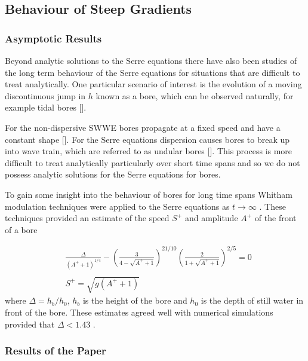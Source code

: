 \subsection{Behaviour of Steep Gradients}




\subsubsection{Asymptotic Results}
Beyond analytic solutions to the Serre equations there have also been studies of the long term behaviour of the Serre equations for situations that are difficult to treat analytically. One particular scenario of interest is the evolution of a moving discontinuous jump in $h$ known as a bore, which can be observed naturally, for example tidal bores [].

For the non-dispersive SWWE bores propagate at a fixed speed and have a constant shape []. For the Serre equations dispersion causes bores to break up into wave train, which are referred to as undular bores []. This process is more difficult to treat analytically particularly over short time spans and so we do not possess analytic solutions for the Serre equations for bores.

To gain some insight into the behaviour of bores for long time spans Whitham modulation techniques were applied to the Serre equations as $t \rightarrow \infty$ \cite{El-etal-2006}. These techniques provided an estimate of the speed $S^+$ and amplitude $A^+$ of the front of a bore

\begin{subequations}
	\begin{align}
	&\frac{\Delta}{\left(A^+ + 1\right)^{1/4}} - \left(\frac{3}{4 -  \sqrt{A^+ + 1}}\right)^{21/10} \left(\frac{2}{1 + \sqrt{A^+ + 1}}\right)^{2/5} = 0	\label{eqn:Aplusdef} \\  \nonumber \\
	&S^+ = \sqrt{g \left(A^+ + 1\right)}	\label{eqn:Splusdef}
	\end{align}
	\label{eqn:ELWhitMod}	
\end{subequations}
where $\Delta = h_b / h_0$, $h_b$ is the height of the bore and $h_0$ is the depth of still water in front of the bore. These estimates agreed well with numerical simulations provided that $\Delta < 1.43$ \cite{El-etal-2006}.


\subsubsection{Results of the Paper}




